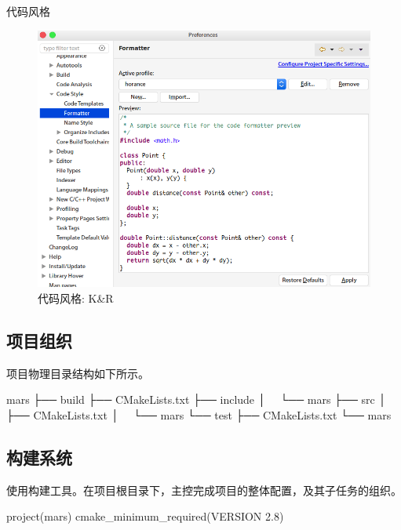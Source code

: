 \begin{content}
\begin{episode}{代码风格}
\begin{content}
\begin{figure}[H]
\centering
\includegraphics[width=1.0\textwidth]{figures/xunit/eclipse-formatter.png}
\caption{代码风格: K\&R}
 \label{fig:eclipse-formatter}
\end{figure}

\end{content}

\end{episode}

\subsection{项目组织}

项目物理目录结构如下所示。

\begin{leftbar}
 \begin{c++}[caption={\ttfamily{项目组织}}]
mars
├── build
├── CMakeLists.txt
├── include
│   └── mars
├── src
│   ├── CMakeLists.txt
│   └── mars
└── test
    ├── CMakeLists.txt
    └── mars
 \end{c++}
\end{leftbar}

\subsection{构建系统}

使用构建工具。在项目根目录下，主控完成项目的整体配置，及其子任务的组织。

\begin{leftbar}
 \begin{c++}[caption={\ttfamily{CMakeLists.txt}}]
project(mars)                                                                                  
cmake_minimum_required(VERSION 2.8)


\end{c++}
\end{leftbar}
\end{content}
